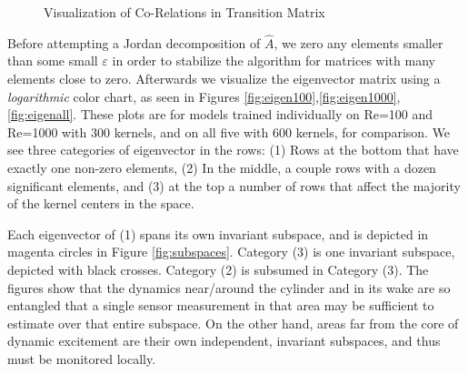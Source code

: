 \documentclass[letterpaper,12pt,peerreviewca,draftcls]{IEEEtran}
\newcommand{\dualop}{A}
\newcommand{\dualopApprox}{\widehat{\dualop}}
\begin{document}
\begin{figure}[h] %
	\centering
	\caption{Visualization of Co-Relations in Transition Matrix}
\end{figure}

Before attempting a Jordan decomposition of $\dualopApprox$, we zero any elements smaller than some small $\varepsilon$ in order to stabilize the algorithm for matrices with many elements close to zero. Afterwards we visualize the eigenvector matrix using a \emph{logarithmic} color chart, as seen in Figures \ref{fig:eigen100},\ref{fig:eigen1000},\ref{fig:eigenall}. These plots are for models trained individually on Re=100 and Re=1000 with 300 kernels, and on all five with 600 kernels, for comparison. We see three categories of eigenvector in the rows: (1) Rows at the bottom that have exactly one non-zero elements, (2) In the middle, a couple rows with a dozen significant elements, and (3) at the top a number of rows that affect the majority of the kernel centers in the space.

Each eigenvector of (1) spans its own invariant subspace, and is depicted in magenta circles in Figure \ref{fig:subspaces}. Category (3) is one invariant subspace, depicted with black crosses. Category (2) is subsumed in Category (3). The figures show that the dynamics near/around the cylinder and in its wake are so entangled that a single sensor measurement in that area may be sufficient to estimate over that entire subspace. On the other hand, areas far from the core of dynamic excitement are their own independent, invariant subspaces, and thus must be monitored locally.
\end{document}

